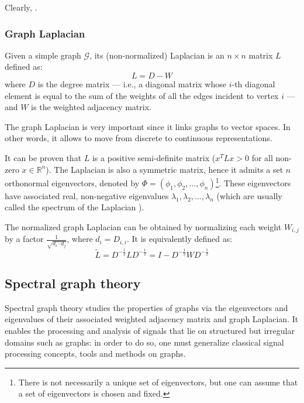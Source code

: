                 Clearly,  \cite{Bronstein}.
            \subsubsection{Graph Laplacian}
                Given a simple graph \(\mathcal{G}\), its (non-normalized) Laplacian \cite[12]{Chung} is an \(n \times n\) matrix \(L\) defined as:
                \[L = D - W\]
                where \(D\) is the degree matrix --- i.e., a diagonal matrix whose \(i\)-th diagonal element is equal to the sum of the weights of all the edges incident to vertex \(i\) --- and \(W\) is the weighted adjacency matrix.
                
                The graph Laplacian is very important since it links graphs to vector spaces. In other words, it allows to move from discrete to continuous representations.
                
                It can be proven that \(L\) is a positive semi-definite matrix (\(x^T L x > 0\) for all non-zero \(x \in \mathbb{R}^n\)). The Laplacian is also a symmetric matrix, hence it admits a set \(n\) orthonormal eigenvectors, denoted by \(\Phi = \left(\phi_1, \phi_2, \dots, \phi_n\right)\)\footnote{There is not necessarily a unique set of eigenvectors, but one can assume that a set of eigenvectors is chosen and fixed.}. These eigenvectors have associated real, non-negative eigenvalues \(\lambda_1, \lambda_2, \dots, \lambda_n\) (which are usually called the spectrum of the Laplacian \cite[4]{Chung}).
                
                The normalized graph Laplacian can be obtained by normalizing each weight \(W_{i,j}\) by a factor \(\frac{1}{\sqrt{d_i \cdot d_j}}\), where \(d_i = D_{i,i}\). It is equivalently defined as:
                \[\tilde{L} = D^{-\frac{1}{2}}LD^{-\frac{1}{2}} = I - D^{-\frac{1}{2}}WD^{-\frac{1}{2}}\]
        \subsection{Spectral graph theory}
            Spectral graph theory studies the properties of graphs via the eigenvectors and eigenvalues of their associated weighted adjacency matrix and graph Laplacian. It enables the processing and analysis of signals that lie on structured but irregular domains such as graphs: in order to do so, one must generalize classical signal processing concepts, tools and methods on graphs.
